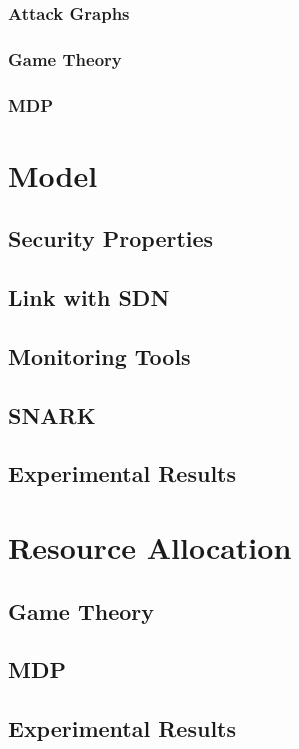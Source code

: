 \documentclass[a4paper, 11pt]{article}
\begin{document}
\subsubsection{Attack Graphs}
\cite{Kanaoka2009,mitigateAPT-johnson2013}
\subsubsection{Game Theory}
\cite{MuraliKodialam2004,Huang2018,Chen2009,interdep-ismail2017,Kantzavelou2010,Nguyen2009,Zhu2009,Roy2010,Sallhammar2007,Kiennert2018}
\subsubsection{MDP}
\cite{Chades2014,Bokani2015,Anupama2014,bellman1957,Wang2013}


\section{Model}
\subsection{Security Properties}
\subsection{Link with SDN}
\subsection{Monitoring Tools}
\subsection{SNARK}
\subsection{Experimental Results}

\section{Resource Allocation}
\subsection{Game Theory}
\subsection{MDP}
\subsection{Experimental Results}




{}

\end{document}
